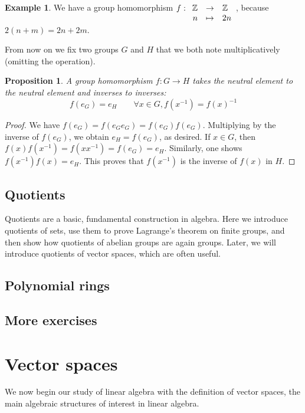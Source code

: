 \documentclass{book}
\newcommand{\Z}{\mathbb{Z}}
\newcommand{\applic}[4]{\begin{array}[t]{rcl}
#1 & \to & #2 \\
#3 & \mapsto & #4
\end{array}}
\theoremstyle{plain}
\newtheorem{proposition}[theorem]{Proposition}
\theoremstyle{definition}
\newtheorem{example}[theorem]{Example}
\theoremstyle{remark}
\begin{document}
\begin{example}
    We have a group homomorphism $f : \applic{\Z}{\Z}{n}{2n}$, because $2(n+m) = 2n + 2m$. 
\end{example}

From now on we fix two groups $G$ and $H$ that we both note multiplicatively (omitting the operation).

\begin{proposition}
    A group homomorphism $f : G \to H$ takes the neutral element to the neutral element and inverses to inverses:
    \[f(e_G) = e_H \qquad \forall x \in G, f(x^{-1}) = f(x)^{-1}\]
\end{proposition}

\begin{proof}
    We have $f(e_G) = f(e_G e_G) = f(e_G) f(e_G)$. Multiplying by the inverse of $f(e_G)$, we obtain $e_H = f(e_G)$, as desired. If $x \in G$, then $f(x)f(x^{-1}) = f(xx^{-1}) = f(e_G) = e_H$. Similarly, one shows $f(x^{-1})f(x) = e_H$. This proves that $f(x^{-1})$ is the inverse of $f(x)$ in $H$.
\end{proof}



\section{Quotients}

Quotients are a basic, fundamental construction in algebra. Here we introduce quotients of sets, use them to prove Lagrange's theorem on finite groups, and then show how quotients of abelian groups are again groups. Later, we will introduce quotients of vector spaces, which are often useful.

\section{Polynomial rings}

\section{More exercises}


\chapter{Vector spaces}

We now begin our study of linear algebra with the definition of vector spaces, the main algebraic structures of interest in linear algebra.
\end{document}
